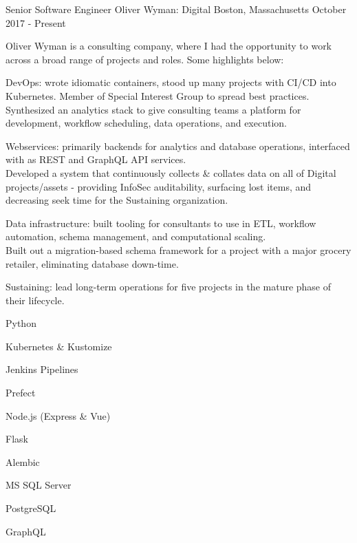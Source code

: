 

\begin{cventries}

  \cventry%
    {Senior Software Engineer} %
    {Oliver Wyman: Digital} %
    {Boston, Massachusetts} %
    {October 2017 \-- Present} %
    {%
      \begin{cvsentence}Oliver Wyman is a consulting company, where I had the opportunity to work across a broad range of projects and roles. Some highlights below:\end{cvsentence}
      \begin{cvitems} %
        \item {DevOps: wrote idiomatic containers, stood up many projects with CI/CD into Kubernetes. Member of Special Interest Group to spread best practices.} \\
        Synthesized an analytics stack to give consulting teams a platform for development, workflow scheduling, data operations, and execution.
        \item {Webservices: primarily backends for analytics and database operations, interfaced with as REST and GraphQL API services.} \\
        Developed a system that continuously collects \& collates data on all of Digital projects/assets \-- providing InfoSec auditability, surfacing lost items, and decreasing seek time for the Sustaining organization.
        \item {Data infrastructure: built tooling for consultants to use in ETL, workflow automation, schema management, and computational scaling.} \\
        Built out a migration-based schema framework for a project with a major grocery retailer, eliminating database down-time.
        \item {Sustaining: lead long-term operations for five projects in the mature phase of their lifecycle.}
      \end{cvitems}
    }
    \begin{cventryskills}
      \item Python
      \item Kubernetes \& Kustomize
      \item Jenkins Pipelines
      \item Prefect
      \item Node.js (Express \& Vue)
      \item Flask
      \item Alembic
      \item MS SQL Server
      \item PostgreSQL
      \item GraphQL
    \end{cventryskills}


\end{cventries}
